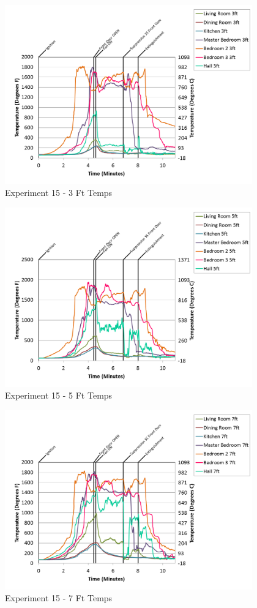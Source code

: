 \documentclass{article}
\begin{document}
\begin{appendices}
\begin{figure}[h!]
	\centering
	\includegraphics[height=3.05in]{0_Images/Results_Charts/Exp_15_Charts/3FtTemps.png}
	\caption{Experiment 15 - 3 Ft Temps}
\end{figure}

\clearpage

\begin{figure}[h!]
	\centering
	\includegraphics[height=3.05in]{0_Images/Results_Charts/Exp_15_Charts/5FtTemps.png}
	\caption{Experiment 15 - 5 Ft Temps}
\end{figure}


\begin{figure}[h!]
	\centering
	\includegraphics[height=3.05in]{0_Images/Results_Charts/Exp_15_Charts/7FtTemps.png}
	\caption{Experiment 15 - 7 Ft Temps}
\end{figure}


\end{appendices}
\end{document}
